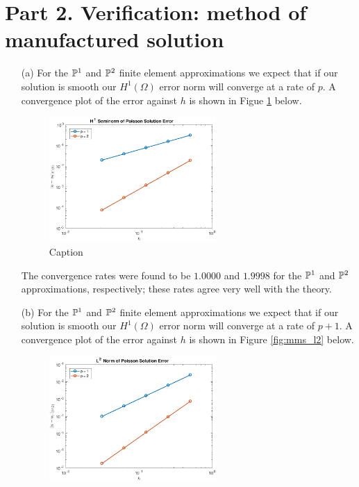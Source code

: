 \documentclass{article}
\begin{document}
\section*{Part 2. Verification: method of manufactured solution}
\begin{itemize}
	\item[(a)] For the \(\mathbb{P}^1 \) and \(\mathbb{P}^2 \) finite element approximations we expect that if our solution is smooth our \(H^1(\Omega) \) error norm will converge at a rate of \(p\). A convergence plot of the error against \(h\) is shown in Figue \ref{fig:mms_h1} below.
	\begin{figure}[H]
		\centering
		\includegraphics[width=0.6\textwidth]{MMS_H1_conv.pdf}
		\caption{Caption}
		\label{fig:mms_h1}
	\end{figure}
	The convergence rates were found to be \(1.0000\) and \(1.9998\) for the \(\mathbb{P}^1 \) and \(\mathbb{P}^2 \) approximations, respectively; these rates agree very well with the theory.
	\item[(b)] For the \(\mathbb{P}^1 \) and \(\mathbb{P}^2 \) finite element approximations we expect that if our solution is smooth our \(H^1(\Omega) \) error norm will converge at a rate of \(p+1\). A convergence plot of the error against \(h\) is shown in Figure \ref{fig:mms_l2} below.
	\begin{figure}[H]
		\centering
		\includegraphics[width=0.6\textwidth]{MMS_L2_conv.pdf}

\end{figure}
\end{itemize}
\end{document}
